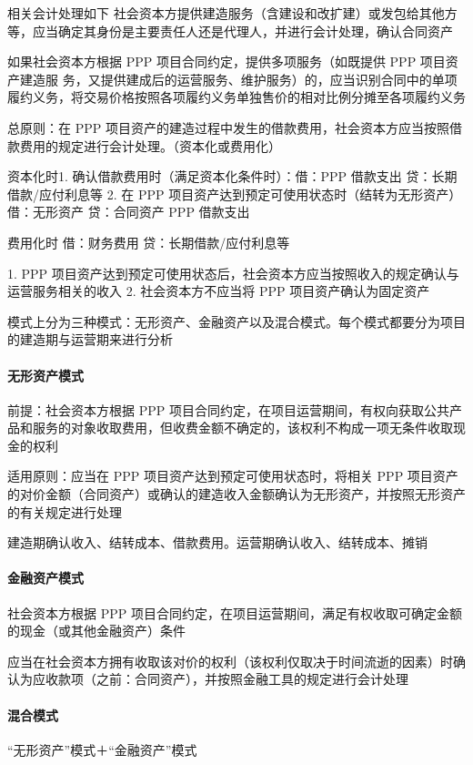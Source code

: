\documentclass[UTF8,12pt]{ctexart}
\numberwithin{equation}{section} %
\numberwithin{figure}{section}
\numberwithin{table}{section}
\begin{document}
	相关会计处理如下
	社会资本方提供建造服务（含建设和改扩建）或发包给其他方等，应当确定其身份是主要责任人还是代理人，并进行会计处理，确认合同资产
	
	如果社会资本方根据 PPP 项目合同约定，提供多项服务（如既提供 PPP 项目资产建造服 务，又提供建成后的运营服务、维护服务）的，应当识别合同中的单项履约义务，将交易价格按照各项履约义务单独售价的相对比例分摊至各项履约义务
	
	总原则：在 PPP 项目资产的建造过程中发生的借款费用，社会资本方应当按照借款费用的规定进行会计处理。（资本化或费用化）
	
	资本化时1.	确认借款费用时（满足资本化条件时）：借：PPP 借款支出
	贷：长期借款/应付利息等
	2.	在 PPP 项目资产达到预定可使用状态时（结转为无形资产）借：无形资产
	贷：合同资产
	PPP 借款支出
	
	费用化时
	借：财务费用
	贷：长期借款/应付利息等
	
	1.	PPP 项目资产达到预定可使用状态后，社会资本方应当按照收入的规定确认与运营服务相关的收入
	2.	社会资本方不应当将 PPP 项目资产确认为固定资产
	
	模式上分为三种模式：无形资产、金融资产以及混合模式。每个模式都要分为项目的建造期与运营期来进行分析
	
	\paragraph{无形资产模式}前提：社会资本方根据 PPP 项目合同约定，在项目运营期间，有权向获取公共产品和服务的对象收取费用，但收费金额不确定的，该权利不构成一项无条件收取现金的权利
	
	适用原则：应当在 PPP 项目资产达到预定可使用状态时，将相关 PPP 项目资产的对价金额（合同资产）或确认的建造收入金额确认为无形资产，并按照无形资产的有关规定进行处理
	
	建造期确认收入、结转成本、借款费用。运营期确认收入、结转成本、摊销
	
	\paragraph{金融资产模式}
	社会资本方根据 PPP 项目合同约定，在项目运营期间，满足有权收取可确定金额的现金（或其他金融资产）条件
	
	应当在社会资本方拥有收取该对价的权利（该权利仅取决于时间流逝的因素）时确认为应收款项（之前：合同资产），并按照金融工具的规定进行会计处理
	
	\paragraph{混合模式}
	“无形资产”模式＋“金融资产”模式
	
\end{document}
